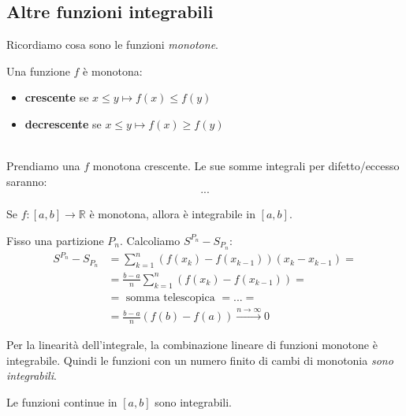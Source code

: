 \subsection{Altre funzioni integrabili}

Ricordiamo cosa sono le funzioni \textit{monotone}.

\begin{definizione}
    Una funzione $f$ è monotona:
    \begin{itemize}
        \item \textbf{crescente} se $x \leq y \mapsto f(x)\leq f(y)$
        \item \textbf{decrescente} se $x\leq y \mapsto f(x)\geq f(y)$
    \end{itemize}
\end{definizione}

\leavevmode \\
Prendiamo una $f$ monotona crescente. Le sue somme integrali per difetto/eccesso saranno:
\begin{align}
    ...
\end{align}

\begin{teorema}
    Se $f:[a,b]\to \mathbb{R}$ è monotona, allora è integrabile in $[a,b]$.
\end{teorema}

\begin{dimostrazione}
    Fisso una partizione $P_n$. Calcoliamo $S^{P_n}-S_{P_n}$:
    \begin{align}
        S^{P_n}-S_{P_n} &= \sum_{k=1}^{n} (f(x_k) - f(x_{k-1}))(x_k-x_{k-1}) = \\
                      &= \frac{b-a}{n}\sum_{k=1}^{n}(f(x_k)-f(x_{k-1})) = \\
                      &= \text{ somma telescopica } = ... = \\
                      &= \frac{b-a}{n}(f(b)-f(a)) \xrightarrow{n\to\infty} 0
    \end{align}
\end{dimostrazione}

\begin{corollario*}
    Per la linearità dell'integrale, la combinazione lineare di funzioni monotone è integrabile. Quindi le funzioni con un numero finito di cambi di monotonia \textit{sono integrabili}.
\end{corollario*}

\begin{teorema}
    Le funzioni continue in $[a,b]$ sono integrabili. \\
\end{teorema}

